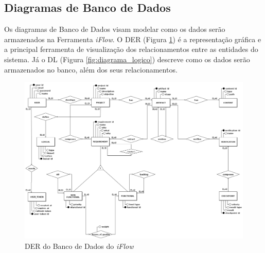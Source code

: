 \label{sec:diagramas_da_aplicacao}

\subsection{Diagramas de Banco de Dados}

Os diagramas de Banco de Dados visam modelar como os dados serão armazenados na Ferramenta \textit{iFlow}. O DER (Figura \ref{fig:diagrama_conceitual}) é a representação gráfica e a principal ferramenta de visualização dos relacionamentos entre as entidades do sistema. Já o DL (Figura \ref{fig:diagrama_logico}) descreve como os dados serão armazenados no banco, além dos seus relacionamentos.

\begin{figure}[H]
    \begin{center}
        \caption{{DER do Banco de Dados do \textit{iFlow}}}
        \label{fig:diagrama_conceitual}
        \includegraphics[scale=0.30]{figuras/Proposta/Conceitual_iFlow.png}
    \end{center}
\end{figure}

